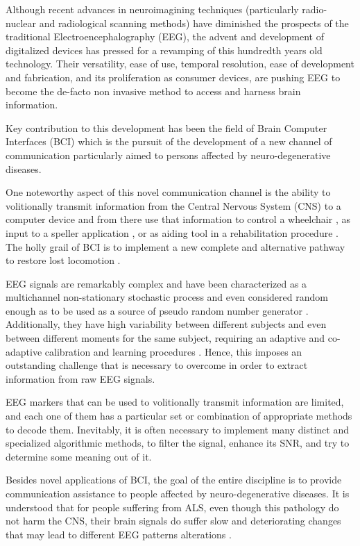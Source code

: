 \documentclass[entropy,article,submit,moreauthors,pdftex,10pt,a4paper]{mdpi}
\begin{document}
Although recent advances in neuroimagining techniques (particularly radio-nuclear and radiological scanning methods) \citep{Schomer2010} have diminished the prospects of the traditional Electroencephalography (EEG), the advent and development of digitalized devices has pressed for a revamping of this hundredth years old technology.  Their versatility, ease of use, temporal resolution, ease of development and fabrication, and its proliferation as consumer devices, are pushing EEG to become the de-facto non invasive method to access and harness brain information.

Key contribution to this development has been the field of Brain Computer Interfaces (BCI) \citep{WolpawJonathanR2012} which is the pursuit of the development of a new channel of communication particularly aimed to persons affected by neuro-degenerative diseases.

One noteworthy aspect of this novel communication channel is the ability to volitionally transmit information from the Central Nervous System (CNS) to a computer device and from there use that information to control a wheelchair \citep{Carlson2013}, as input to a speller application \citep{Guger2009a}, or as aiding tool in a rehabilitation procedure \citep{Jure2016}.  The holly grail of BCI is to implement a new complete and alternative pathway to restore lost locomotion \citep{WolpawJonathanR2012}.

EEG signals are remarkably complex and have been characterized as a multichannel non-stationary stochastic process and even considered random enough as to be used as a source of pseudo random number generator \citep{Chen2014}. Additionally, they have high variability between different subjects and even between different moments for the same subject, requiring an adaptive and co-adaptive calibration and learning procedures \citep{Clerc}.  Hence, this imposes an outstanding challenge that is necessary to overcome in order to extract information from raw EEG signals.

EEG markers \citep{Clerc} that can be used to volitionally transmit information are limited, and each one of them has a particular set or combination of appropriate methods to decode them. Inevitably, it is often necessary to implement many distinct and specialized algorithmic methods, to filter the signal, enhance its SNR, and try to determine some meaning out of it.  

Besides novel applications of BCI, the goal of the entire discipline is to provide communication assistance to people affected by neuro-degenerative diseases.  It is understood that for people suffering from ALS, even though this pathology do not harm the CNS, their brain signals do suffer slow and deteriorating changes that may lead to different EEG patterns alterations \citep{Nijboer2009,Riener2014}.
\end{document}
